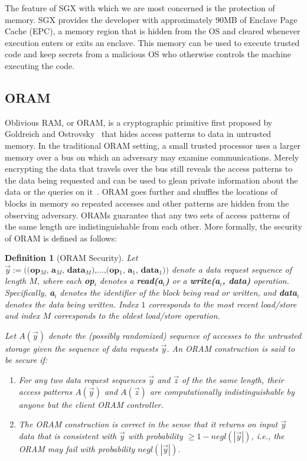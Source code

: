 \documentclass[letterpaper,twocolumn,10pt]{article}
\newtheorem{definition}[theorem]{Definition}
\begin{document}
The feature of SGX with which we are most concerned is the protection of memory. SGX provides the developer with approximately 90MB of Enclave Page Cache (EPC), a memory region that is hidden from the OS and cleared whenever execution enters or exits an enclave. This memory can be used to execute trusted code and keep secrets from a malicious OS who otherwise controls the machine executing the code. 

\subsection{ORAM}
Oblivious RAM, or ORAM, is a cryptographic primitive first proposed by Goldreich and Ostrovsky~\cite{GO96} that hides access patterns to data in untrusted memory. In the traditional ORAM setting, a small trusted processor uses a larger memory over a bus on which an adversary may examine communications. Merely encrypting the data that travels over the bus still reveals the access patterns to the data being requested and can be used to glean private information about the data or the queries on it~\cite{IKK12}. ORAM goes further and shuffles the locations of blocks in memory so repeated accesses and other patterns are hidden from the observing adversary. ORAMs guarantee that any two sets of access patterns of the same length are indistinguishable from each other. More formally, the security of ORAM is defined as follows:
\begin{definition}[ORAM Security\cite{SDS+13}]
Let $\overrightarrow{y}:=\textbf{((op$_M$, a$_M$, data$_M$),...,(op$_1$, a$_1$, data$_1$))}$ denote a data request sequence of length $M$, where each \textbf{op$_i$} denotes a \textbf{read(a$_i$)} or a \textbf{write(a$_i$, data)} operation. Specifically, \textbf{a$_i$} denotes the identifier of the block being read or written, and \textbf{data$_i$} denotes the data being written. Index $1$ corresponds to the most recent load/store and index $M$ corresponds to the oldest load/store operation. 

Let $A(\overrightarrow{y})$ denote the (possibly randomized) sequence of accesses to the untrusted storage given the sequence of data requests $\overrightarrow{y}$. An ORAM construction is said to be secure if:
\begin{enumerate}
\setlength\itemsep{0pt}
\item For any two data request sequences $\overrightarrow{y}$ and $\overrightarrow{z}$ of the the same length, their access patterns $A(\overrightarrow{y})$ and $A(\overrightarrow{z})$ are computationally indistinguishable by anyone but the client ORAM controller.

\item The ORAM construction is correct in the sense that it returns on input $\overrightarrow{y}$ data that is consistent with $\overrightarrow{y}$ with probability $\geq 1 - \textit{negl}(|\overrightarrow{y}|)$, i.e., the ORAM may fail with probability $\textit{negl}(|\overrightarrow{y}|)$.
\end{enumerate}
\end{definition}
\end{document}
